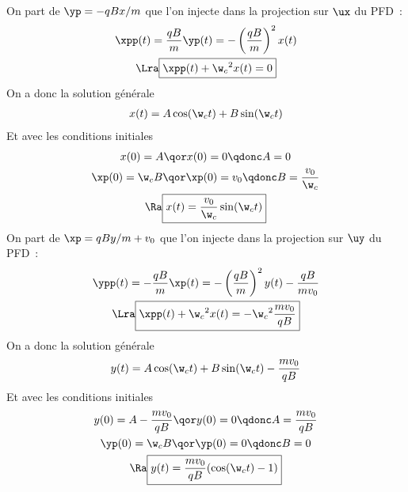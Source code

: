 \documentclass[../main/main.tex]{subfiles}
\begin{document}
\begin{itemize}[label=$\diamond$]
     On part de $\yp = -qBx/m$ que l'on injecte dans la
        projection sur $\ux$ du PFD~:
        \begin{gather*}
            \xpp(t) = \frac{qB}{m}\yp(t) = - \left( \frac{qB}{m} \right)^2x(t)
            \\\Lra
            \boxed{\xpp(t) + \w_c{}^2x(t) = 0}
        \end{gather*}
        On a donc la solution générale
        \begin{gather*}
            x(t) = A\cos(\w_ct) + B\sin(\w_ct)
        \end{gather*}
        Et avec les conditions initiales
        \begin{gather*}
            x(0) = A
            \qor
            x(0) = 0
            \qdonc
            A = 0
            \\
            \xp(0) = \w_cB
            \qor
            \xp(0) = v_0
            \qdonc
            B = \frac{v_0}{\w_c}
            \\\Ra
            \boxed{x(t) = \frac{v_0}{\w_c}\sin(\w_ct)}
        \end{gather*}
     On part de $\xp = qBy/m + v_0$ que l'on injecte dans la
        projection sur $\uy$ du PFD~:
        \begin{gather*}
            \ypp(t) = -\frac{qB}{m}\xp(t) = - \left( \frac{qB}{m} \right)^2y(t)
            - \frac{qB}{mv_0}
            \\\Lra
            \boxed{\xpp(t) + \w_c{}^2x(t) = -\w_c{}^2\frac{mv_0}{qB}}
        \end{gather*}
        On a donc la solution générale
        \begin{gather*}
            y(t) = A\cos(\w_ct) + B\sin(\w_ct) - \frac{mv_0}{qB}
        \end{gather*}
        Et avec les conditions initiales
        \begin{gather*}
            y(0) = A - \frac{mv_0}{qB}
            \qor
            y(0) = 0
            \qdonc
            A = \frac{mv_0}{qB}
            \\
            \yp(0) = \w_cB
            \qor
            \yp(0) = 0
            \qdonc
            B = 0
            \\\Ra
            \boxed{y(t) = \frac{mv_0}{qB}(\cos(\w_ct)-1)}
        \end{gather*}
\end{itemize}
\end{document}
